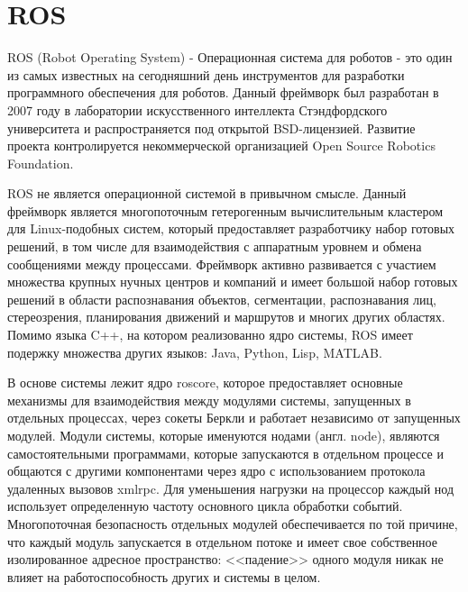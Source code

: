 \section{ROS}

ROS (Robot Operating System) - Операционная система для роботов - это один из самых известных на сегодняшний день инструментов для разработки программного обеспечения для роботов. Данный фреймворк был разработан в 2007 году в лаборатории искусственного интеллекта Стэндфордского университета и распространяется под открытой BSD-лицензией. Развитие проекта контролируется некоммерческой организацией Open Source Robotics Foundation.

ROS не является операционной системой в привычном смысле. Данный фреймворк является многопоточным гетерогенным вычислительным кластером для Linux-подобных систем, который предоставляет разработчику набор готовых решений, в том числе для взаимодействия с аппаратным уровнем и обмена сообщениями между процессами. Фреймворк активно развивается \cite{boren2011exponential} с участием множества крупных нучных центров и компаний и имеет большой набор готовых решений в области распознавания объектов, сегментации, распознавания лиц, стереозрения, планирования движений и маршрутов и многих других областях. Помимо языка C++, на котором реализованно ядро системы, ROS имеет подержку множества других языков: Java, Python, Lisp, MATLAB.

В основе системы лежит ядро roscore, которое предоставляет 
основные механизмы для взаимодействия между модулями системы, 
запущенных в отдельных процессах, через сокеты Беркли и работает 
независимо от запущенных модулей. Модули системы, которые 
именуются нодами (англ. node),  являются самостоятельными 
программами, которые запускаются в отдельном процессе и общаются 
с другими компонентами через ядро с использованием протокола 
удаленных вызовов xmlrpc. Для уменьшения нагрузки на процессор 
каждый нод использует определенную частоту основного цикла 
обработки событий. Многопоточная безопасность отдельных модулей 
обеспечивается по той причине, что каждый модуль запускается в 
отдельном потоке и имеет свое собственное изолированное адресное 
пространство: <<падение>> одного модуля никак не влияет на 
работоспособность других и системы в целом.

